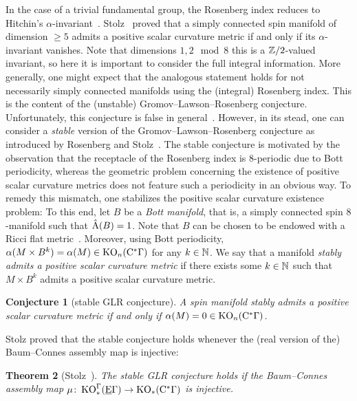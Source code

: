\documentclass[pdftex]{sigma}
\numberwithin{equation}{section}
\newtheorem{Theorem}{Theorem}[section]
\newtheorem{Conjecture}[Theorem]{Conjecture}
 { \theoremstyle{definition}
\newtheorem{Definition}[Theorem]{Definition}
\newtheorem{Note}[Theorem]{Note}
\newtheorem{Example}[Theorem]{Example}
\newtheorem{Remark}[Theorem]{Remark} }
\begin{document}
In the case of a trivial fundamental group, the Rosenberg index reduces to Hitchin's \(\alpha\)-invariant~\cite{Hitchin:HarmonicSpinors}.
Stolz~\cite{Stolz:SimplyConnected} proved that a simply connected spin manifold of dimension \(\geq 5\) admits a positive scalar curvature metric if and only if its \(\alpha\)-invariant vanishes.
Note that dimensions \(1,2 \mod 8\) this is a \(\mathbb{Z}/2\)-valued invariant, so here it is important to consider the full integral information.
More generally, one might expect that the analogous statement holds for not necessarily simply connected manifolds using the (integral) Rosenberg index.
This is the content of the (unstable) Gromov--Lawson--Rosenberg conjecture.
Unfortunately, this conjecture is false in general~\cite{Schick:Counterexample}.
However, in its stead, one can consider a \emph{stable} version of the Gromov--Lawson--Rosenberg conjecture as introduced by Rosenberg and Stolz~\cite{RosenbergStolz:StableGLR}.
The stable conjecture is motivated by the observation that the receptacle of the Rosenberg index is \(8\)-periodic due to Bott periodicity, whereas the geometric problem concerning the existence of positive scalar curvature metrics does not feature such a periodicity in an obvious way.
To remedy this mismatch, one stabilizes the positive scalar curvature existence problem:
To this end, let \(B\) be a \emph{Bott manifold}, that is, a simply connected spin \(8\)-manifold such that \(\hat{\mathrm{A}}(B) = 1\).
Note that \(B\) can be chosen to be endowed with a Ricci flat metric~\cite{Joyce:Compact8Mfd}.
Moreover, using Bott periodicity, \(\alpha(M \times B^k) = \alpha(M) \in \operatorname{KO}_{n}(\mathrm{C}^\ast \Gamma)\) for any \(k \in \mathbb{N}\).
We say that a manifold \emph{stably admits a positive scalar curvature metric} if there exists some \(k \in \mathbb{N}\) such that \(M \times B^k\) admits a positive scalar curvature metric.
\begin{Conjecture}[stable GLR conjecture] \label{conj:stable-glr}
 A spin manifold stably admits a positive scalar curvature metric if and only if \(\alpha(M) = 0 \in \operatorname{KO}_n(\mathrm{C}^\ast \Gamma)\).
\end{Conjecture}

Stolz proved that the stable conjecture holds whenever the (real version of the) Baum--Connes assembly map is injective:

\begin{Theorem}[Stolz~{\cite[Theorem~3.10]{Stolz:ManifoldsOfPSC}}] \label{thm:Stolz-Stable-GLR}
 The stable GLR conjecture holds if the Baum--Connes assembly map \(\mu \colon \operatorname{KO}_\ast^\Gamma(\underline{\mathrm{E}} \Gamma) \to \operatorname{KO}_\ast(\mathrm{C}^\ast \Gamma)\) is injective.
\end{Theorem}
\end{document}
